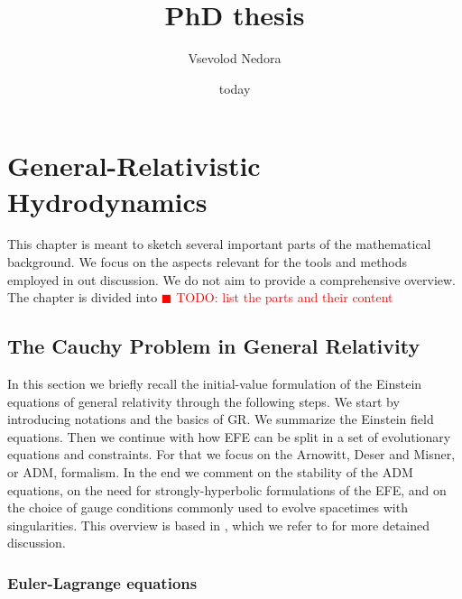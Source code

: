 \documentclass[11pt,a4paper,headinclude=true,DIV=14,BCOR=8mm,chapterprefix,listof=totoc,twoside,openright,abstracton]{scrbook}
\title{PhD thesis}
\author{Vsevolod Nedora}
\date{today}
\newcommand{\todo}[1]{\textcolor{red}{$\blacksquare$ TODO: #1}}
\begin{document}
    
    \maketitle


\chapter{General-Relativistic Hydrodynamics}

This chapter is meant to sketch several important parts of the mathematical background. We focus on the aspects relevant for the tools and methods employed in out discussion. We do not aim to provide a comprehensive overview. 
The chapter is divided into \todo{list the parts and their content}

\section{The Cauchy Problem in General Relativity}

In this section we briefly recall the initial-value formulation of the Einstein equations of general relativity through the following steps. We start by introducing notations and the basics of GR. We summarize the Einstein field equations. Then we continue with how EFE can be split in a set of evolutionary equations and constraints. For that we focus on the Arnowitt, Deser and Misner, or ADM, formalism. In the end we comment on the stability of the ADM equations, on the need for strongly-hyperbolic formulations of the EFE, and on the choice of gauge conditions commonly used to
evolve spacetimes with singularities. This overview is based in \cite{Arnowitt:1962hi,Landau:1982dva,Wald:1984,Misner:1973,Baumgarte:2002jm}, which we refer to for more detained discussion.

\subsection{Euler-Lagrange equations}
\end{document}

